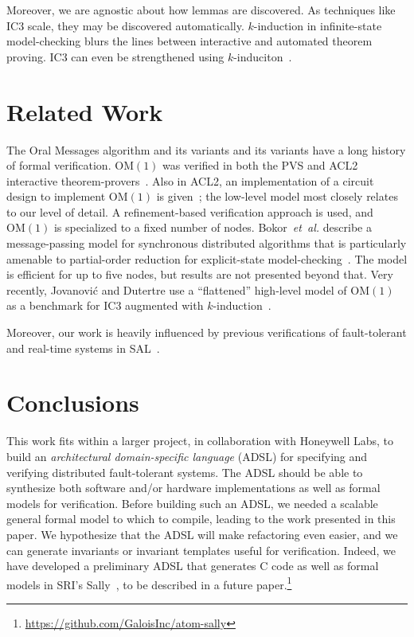 \documentclass{llncs/llncs}
\newcommand{\OM}[1]{\ensuremath{\mathrm{OM}(#1)}\xspace}
\begin{document}
{Moreover, we are agnostic about how lemmas are discovered. As techniques like IC3 scale, they may be discovered automatically. $k$-induction in infinite-state model-checking blurs the lines between interactive and automated theorem proving. IC3 can even be strengthened using $k$-induciton~\cite{pdr-kind}. %

\section{Related Work}\label{sec:related}

The Oral Messages algorithm and its variants and its variants have a long history of formal verification. \OM{1} was verified in both the PVS and ACL2 interactive theorem-provers~\cite{Young97:IC}. Also in ACL2, an implementation of a circuit design to implement \OM{1} is given~\cite{om-acl2-impl}; the low-level model most closely relates to our level of detail. A refinement-based verification approach is used, and \OM{1} is specialized to a fixed number of nodes. Bokor~\emph{et~al.} describe a message-passing model for synchronous distributed algorithms that is particularly amenable to partial-order reduction for explicit-state model-checking~\cite{Bokor2010}. The model is efficient for up to five nodes, but results are not presented beyond that. Very recently, Jovanovi{\'{c}} and Dutertre use a ``flattened'' high-level model of \OM{1} as a benchmark for IC3 augmented with $k$-induction~\cite{pdr-kind}.

Moreover, our work is heavily influenced by previous verifications of fault-tolerant and real-time systems in SAL~\cite{Rushby:OM1,cal,timed-systems}.

\section{Conclusions}\label{sec:conclusions}
This work fits within a larger project, in collaboration with Honeywell Labs, to build an \emph{architectural domain-specific language} (ADSL) for specifying and verifying distributed fault-tolerant systems. The ADSL should be able to synthesize both software and/or hardware implementations as well as formal models for verification. Before building such an ADSL, we needed a scalable general formal model to which to compile, leading to the work presented in this paper. We hypothesize that the ADSL will make refactoring even easier, and we can generate invariants or invariant templates useful for verification. Indeed, we have developed a preliminary ADSL that generates C code as well as formal models in SRI's Sally~\cite{pdr-kind}, to be described in a future paper.\footnote{\url{https://github.com/GaloisInc/atom-sally}}

}
\end{document}

